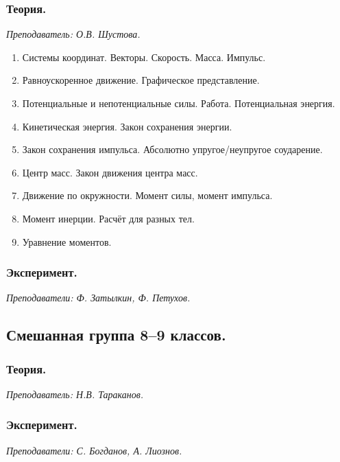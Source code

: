\documentclass[11pt]{article}
\newlength{\h}
\newlength{\x}
\begin{document}
\subsubsection{Теория.}
\label{sec:th9}

\textit{Преподаватель: О.В. Шустова.}

\begin{enumerate}
\item Системы координат. Векторы. Скорость. Масса. Импульс.
\item Равноускоренное движение. Графическое представление.
\item Потенциальные и непотенциальные силы. Работа. Потенциальная
  энергия.
\item Кинетическая энергия. Закон сохранения энергии.
\item Закон сохранения импульса. Абсолютно упругое/неупругое
  соударение.
\item Центр масс. Закон движения центра масс.
\item Движение по окружности. Момент силы, момент импульса.
\item Момент инерции. Расчёт для разных тел.
\item Уравнение моментов. 
\end{enumerate}

\subsubsection{Эксперимент.}
\label{sec:exp9}

\textit{Преподаватели: Ф. Затылкин, Ф. Петухов.}

\subsection{Смешанная группа 8--9 классов.}
\label{sec:daily89}

\subsubsection{Теория.}
\label{sec:th89}

\textit{Преподаватель: Н.В. Тараканов.}

\subsubsection{Эксперимент.}
\label{sec:exp89}

\textit{Преподаватели: С. Богданов, А. Лиознов.}
\end{document}
